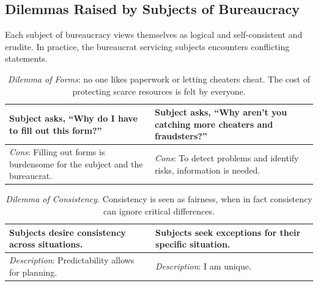 \subsection*{Dilemmas Raised by Subjects of Bureaucracy\label{sec:subjects-dilemmas}}

Each subject of bureaucracy views themselves as logical and self-consistent and erudite. In practice, the bureaucrat servicing subjects encounters conflicting statements. 

\begin{center}
\begin{table}[H] %
\begin{tabular}{ | m{\dilemmatablewidth}| m{\dilemmatablewidth} | } 
  \hline
  \textbf{Subject asks, ``Why do I have to fill out this form?''} &
  \textbf{Subject asks, ``Why aren't you catching more cheaters and fraudsters?''} \\
  \hline
  \textit{Cons}: Filling out forms is burdensome for the subject and the bureaucrat. & 
  \textit{Cons}: To detect problems and identify risks, information is needed. \\
  \hline
\end{tabular}
\caption{\textit{Dilemma of Forms}: no one likes paperwork or letting cheaters cheat. The cost of protecting scarce resources is felt by everyone.
}
\label{table:dilemma-forms}
\end{table}
\end{center}



\begin{center}
\begin{table}[H] %
\begin{tabular}{ | m{\dilemmatablewidth}| m{\dilemmatablewidth} | } 
  \hline
  \textbf{Subjects desire consistency across situations.} &
  \textbf{Subjects seek exceptions for their specific situation.} \\
  \hline
  \textit{Description}: Predictability allows for planning. & 
  \textit{Description}: I am unique. \\
  \hline
\end{tabular}
\caption{\textit{Dilemma of Consistency.}
Consistency is seen as fairness, when in fact consistency can ignore critical differences. %
}
\label{table:dilemma-consistency}
\end{table}
\end{center}

